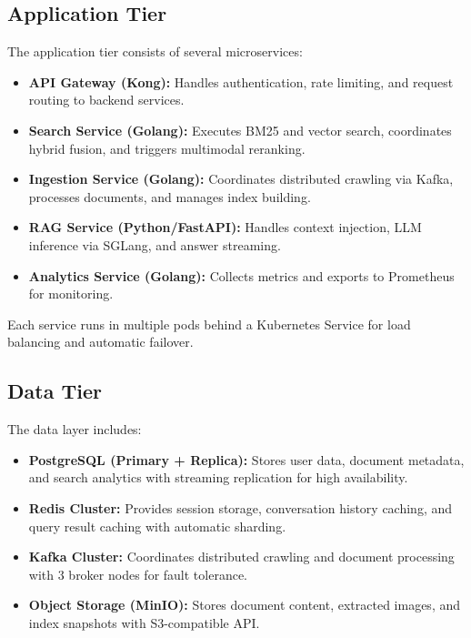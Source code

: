 \subsection{Application Tier}
The application tier consists of several microservices:

\begin{itemize}
    \item \textbf{API Gateway (Kong):} Handles authentication, rate limiting, and request routing to backend services.
    \item \textbf{Search Service (Golang):} Executes BM25 and vector search, coordinates hybrid fusion, and triggers multimodal reranking.
    \item \textbf{Ingestion Service (Golang):} Coordinates distributed crawling via Kafka, processes documents, and manages index building.
    \item \textbf{RAG Service (Python/FastAPI):} Handles context injection, LLM inference via SGLang, and answer streaming.
    \item \textbf{Analytics Service (Golang):} Collects metrics and exports to Prometheus for monitoring.
\end{itemize}

Each service runs in multiple pods behind a Kubernetes Service for load balancing and automatic failover.

\subsection{Data Tier}
The data layer includes:

\begin{itemize}
    \item \textbf{PostgreSQL (Primary + Replica):} Stores user data, document metadata, and search analytics with streaming replication for high availability.
    \item \textbf{Redis Cluster:} Provides session storage, conversation history caching, and query result caching with automatic sharding.
    \item \textbf{Kafka Cluster:} Coordinates distributed crawling and document processing with 3 broker nodes for fault tolerance.
    \item \textbf{Object Storage (MinIO):} Stores document content, extracted images, and index snapshots with S3-compatible API.
\end{itemize}

